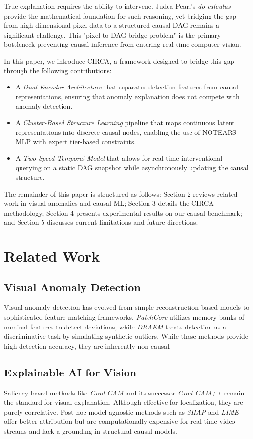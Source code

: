 \documentclass{article}
\begin{document}
True explanation requires the ability to intervene. Judea Pearl's \emph{do-calculus} provide the mathematical foundation for such reasoning, yet bridging the gap from high-dimensional pixel data to a structured causal DAG remains a significant challenge. This "pixel-to-DAG bridge problem" is the primary bottleneck preventing causal inference from entering real-time computer vision.

In this paper, we introduce CIRCA, a framework designed to bridge this gap through the following contributions:
\begin{itemize}
    \item A \emph{Dual-Encoder Architecture} that separates detection features from causal representations, ensuring that anomaly explanation does not compete with anomaly detection.
    \item A \emph{Cluster-Based Structure Learning} pipeline that maps continuous latent representations into discrete causal nodes, enabling the use of NOTEARS-MLP with expert tier-based constraints.
    \item A \emph{Two-Speed Temporal Model} that allows for real-time interventional querying on a static DAG snapshot while asynchronously updating the causal structure.
\end{itemize}

The remainder of this paper is structured as follows: Section 2 reviews related work in visual anomalies and causal ML; Section 3 details the CIRCA methodology; Section 4 presents experimental results on our causal benchmark; and Section 5 discusses current limitations and future directions.

\section{Related Work}

\subsection{Visual Anomaly Detection}
Visual anomaly detection has evolved from simple reconstruction-based models to sophisticated feature-matching frameworks. \emph{PatchCore} \cite{roth2022towards} utilizes memory banks of nominal features to detect deviations, while \emph{DRAEM} \cite{zavrtanik2021draem} treats detection as a discriminative task by simulating synthetic outliers. While these methods provide high detection accuracy, they are inherently non-causal.

\subsection{Explainable AI for Vision}
Saliency-based methods like \emph{Grad-CAM} \cite{selvaraju2017grad} and its successor \emph{Grad-CAM++} \cite{chattopadhyay2018grad} remain the standard for visual explanation. Although effective for localization, they are purely correlative. Post-hoc model-agnostic methods such as \emph{SHAP} \cite{lundberg2017unified} and \emph{LIME} \cite{ribeiro2016why} offer better attribution but are computationally expensive for real-time video streams and lack a grounding in structural causal models.
\end{document}
